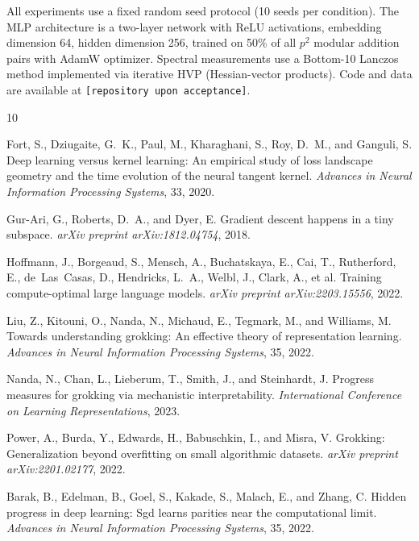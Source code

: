 \documentclass[11pt,twocolumn]{article}
\begin{document}
All experiments use a fixed random seed protocol (10 seeds per condition). The MLP architecture is a two-layer network with ReLU activations, embedding dimension 64, hidden dimension 256, trained on 50\% of all $p^2$ modular addition pairs with AdamW optimizer. Spectral measurements use a Bottom-10 Lanczos method implemented via iterative HVP (Hessian-vector products). Code and data are available at \texttt{[repository upon acceptance]}.


\begin{thebibliography}{10}

Fort, S., Dziugaite, G.~K., Paul, M., Kharaghani, S., Roy, D.~M., and Ganguli, S.
\newblock Deep learning versus kernel learning: An empirical study of loss landscape geometry and the time evolution of the neural tangent kernel.
\newblock \emph{Advances in Neural Information Processing Systems}, 33, 2020.

Gur-Ari, G., Roberts, D.~A., and Dyer, E.
\newblock Gradient descent happens in a tiny subspace.
\newblock \emph{arXiv preprint arXiv:1812.04754}, 2018.

Hoffmann, J., Borgeaud, S., Mensch, A., Buchatskaya, E., Cai, T., Rutherford, E., de~Las~Casas, D., Hendricks, L.~A., Welbl, J., Clark, A., et al.
\newblock Training compute-optimal large language models.
\newblock \emph{arXiv preprint arXiv:2203.15556}, 2022.

Liu, Z., Kitouni, O., Nanda, N., Michaud, E., Tegmark, M., and Williams, M.
\newblock Towards understanding grokking: An effective theory of representation learning.
\newblock \emph{Advances in Neural Information Processing Systems}, 35, 2022.

Nanda, N., Chan, L., Lieberum, T., Smith, J., and Steinhardt, J.
\newblock Progress measures for grokking via mechanistic interpretability.
\newblock \emph{International Conference on Learning Representations}, 2023.

Power, A., Burda, Y., Edwards, H., Babuschkin, I., and Misra, V.
\newblock Grokking: Generalization beyond overfitting on small algorithmic datasets.
\newblock \emph{arXiv preprint arXiv:2201.02177}, 2022.

Barak, B., Edelman, B., Goel, S., Kakade, S., Malach, E., and Zhang, C.
\newblock Hidden progress in deep learning: Sgd learns parities near the computational limit.
\newblock \emph{Advances in Neural Information Processing Systems}, 35, 2022.

\end{thebibliography}
\end{document}
